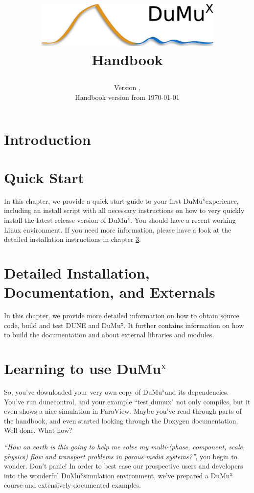 \documentclass[11pt,a4paper,headinclude,footinclude,DIV16]{scrreprt}
\title{
\begin{center}
\includegraphics[width=0.7\textwidth]{../logo/dumux_logo_hires_whitebg.png}
\\[3cm]
{\Huge Handbook}
\end{center}
}
\author{}
\date{Version \DumuxVersion, \\
Handbook version from \today}
\newcommand{\Dune}{{DUNE}\xspace}
\newcommand{\Dumux}{\texorpdfstring{Du\-Mu$^\text{x}$\xspace}{DuMuX\xspace}}
\begin{document}
\maketitle

\setcounter{tocdepth}{1}
\tableofcontents
\newpage

\chapter{Introduction}


\chapter{Quick Start}\label{quick-install}
In this chapter, we provide a quick start guide to
your first \Dumux experience, including an install script with all necessary instructions
on how to very quickly install the latest release version of \Dumux.
You should have a recent working Linux environment.
If you need more information, please have a look at the detailed installation
instructions in chapter \ref{detailed-install}.


\chapter{Detailed Installation, Documentation, and Externals}\label{detailed-install}
In this chapter, we provide more detailed information on how to obtain source code, build and test \Dune and \Dumux.
It further contains information on
how to build the documentation and about external libraries and modules.


\chapter{Learning to use \Dumux}\label{chp:tutorial}
So, you've downloaded your very own copy of \Dumux and its dependencies.
You've run dunecontrol, and your example ``test$\_$dumux" not only compiles,
but it even shows a nice simulation in ParaView.
Maybe you've read through parts of the handbook, and even started looking
through the Doxygen documentation.
Well done. What now? \par
%
\textit{``How on earth is this going to help me solve my multi-(phase, component,
  scale, physics) flow and transport problems in porous media systems?''}, you begin to wonder.
Don't panic! In order to best ease our prospective users and developers into the
wonderful \Dumux simulation environment, we've prepared a \Dumux course and extensively-documented examples.



\end{document}
